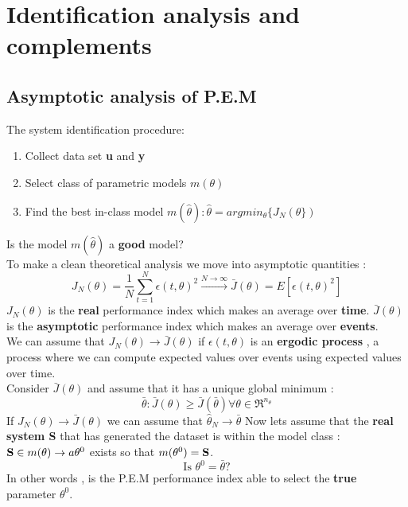 \section{Identification analysis and complements}
\subsection{Asymptotic analysis of P.E.M}
The system identification procedure:
\begin{enumerate}
\item Collect data set \textbf{u} and \textbf{y}
\item Select class of parametric models $m(\theta)$
\item Find the best in-class model $m(\hat{\theta}) : \hat{\theta}=argmin_{\theta}\{J_N({\theta}\})$
\end{enumerate}
Is the model $m(\hat{\theta})$ a \textbf{good} model?\\
To make a clean theoretical analysis we move into asymptotic quantities :
$$ J_N(\theta)=\frac{1}{N}\sum\limits_{t=1}^{N}\epsilon(t,\theta)^2 \xrightarrow[]{N \to \infty} \bar{J}(\theta)=E[\epsilon(t,\theta)^2]$$
$J_N(\theta)$ is the \textbf{real} performance index which makes an average over \textbf{time}. $\bar{J}(\theta)$ is the \textbf{asymptotic} performance index which makes an average over \textbf{events}.\\
We can assume that $J_N(\theta) \to \bar{J}(\theta)$ if $\epsilon(t,\theta)$ is an \textbf{ergodic process} , a process where we can compute expected values over events  using expected values over time.\\
Consider $\bar{J}(\theta)$ and assume that it has a unique global minimum :
$$ \bar{\theta} : \bar{J}(\theta) \geq \bar{J}(\bar{\theta}) \forall \theta \in \Re^{n_{\theta}}$$
If $J_N(\theta) \to \bar{J}(\theta)$ we can assume that $ \hat{\theta}_N \to \bar{\theta}$
Now lets assume that the \textbf{real system S} that has generated the dataset is within the model class : $ \text{\textbf{S}} \in m(\theta) \to a\theta ^0$  exists so that $ m(\theta^0) = \text{\textbf{S}}$.
$$ \text{Is } \theta^0 = \bar{\theta} \text{?}$$
In other words , is the P.E.M performance index able to select the \textbf{true} parameter $\theta^0$.
